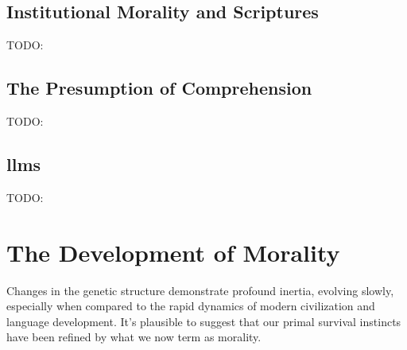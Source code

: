 \documentclass[12pt,a4]{article}
\begin{document}
    \subsection{Institutional Morality and Scriptures}
    TODO:
    \subsection{The Presumption of Comprehension}
    TODO:
    \subsection{ \ac{llms}}
    TODO:

\section{The Development of Morality}

Changes in the genetic structure demonstrate profound inertia, evolving slowly, especially when compared to the rapid dynamics of modern civilization and language development. It's plausible to suggest that our primal survival instincts have been refined by what we now term as morality.
\end{document}
